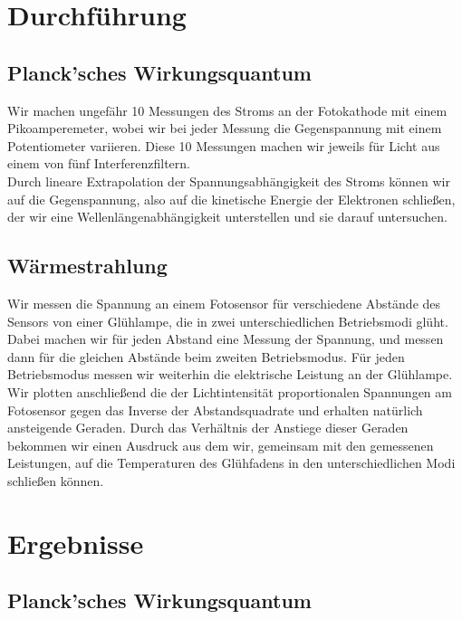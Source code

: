 \documentclass[12pt]{article}
\begin{document}
\section{Durchführung}
\subsection{Planck'sches Wirkungsquantum}
Wir machen ungefähr 10 Messungen des Stroms an der Fotokathode mit einem Pikoamperemeter, wobei wir bei jeder Messung die Gegenspannung mit einem Potentiometer variieren. Diese 10 Messungen machen wir jeweils für Licht aus einem von fünf Interferenzfiltern. \\
Durch lineare Extrapolation der Spannungsabhängigkeit des Stroms können wir auf die Gegenspannung, also auf die kinetische Energie der Elektronen schließen, der wir eine Wellenlängenabhängigkeit unterstellen und sie darauf untersuchen.
\subsection{Wärmestrahlung}
Wir messen die Spannung an einem Fotosensor für verschiedene Abstände des Sensors von einer Glühlampe, die in zwei unterschiedlichen Betriebsmodi glüht. Dabei machen wir für jeden Abstand eine Messung der Spannung, und messen dann für die gleichen Abstände beim zweiten Betriebsmodus. Für jeden Betriebsmodus messen wir weiterhin die elektrische Leistung an der Glühlampe. Wir plotten anschließend die der Lichtintensität proportionalen Spannungen am Fotosensor gegen das Inverse der Abstandsquadrate und erhalten natürlich ansteigende Geraden. Durch das Verhältnis der Anstiege dieser Geraden bekommen wir einen Ausdruck aus dem wir, gemeinsam mit den gemessenen Leistungen, auf die Temperaturen des Glühfadens in den unterschiedlichen Modi schließen können.

\section{Ergebnisse}
\subsection{Planck'sches Wirkungsquantum}
\end{document}
